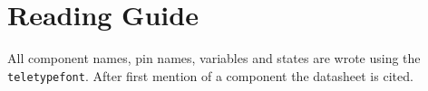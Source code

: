 \section{Reading Guide} %
\label{sec:reading_guide}
All component names, pin names, variables and states are wrote using the \texttt{teletypefont}.
After first mention of a component the datasheet is cited.
